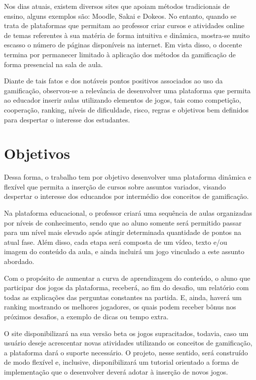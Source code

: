 Nos dias atuais, existem diversos sites que apoiam métodos tradicionais de ensino, alguns exemplos são: Moodle, Sakai e Dokeos. No entanto, quando se trata de plataformas que permitam ao professor criar cursos e atividades online de temas referentes à sua matéria de forma intuitiva e dinâmica, mostra-se muito escasso o número de páginas disponíveis na internet. Em vista disso, o docente termina por permanecer limitado à aplicação dos métodos da gamificação de forma presencial na sala de aula. 

Diante de tais fatos e dos notáveis pontos positivos associados ao uso da gamificação, observou-se a relevância de desenvolver uma plataforma que permita ao educador inserir aulas utilizando elementos de jogos, tais como competição, cooperação, ranking, níveis de dificuldade, risco, regras e objetivos bem definidos para despertar o interesse dos estudantes.

\section{Objetivos}
\label{sc:objetivo}

Dessa forma, o trabalho tem por objetivo desenvolver uma plataforma dinâmica e flexível que permita a inserção de cursos sobre assuntos variados, visando despertar o interesse dos educandos por intermédio dos conceitos de gamificação.

Na plataforma educacional, o professor criará uma sequência de aulas organizadas por níveis de conhecimento, sendo que ao aluno somente será permitido passar para um nível mais elevado após atingir determinada quantidade de pontos na atual fase. Além disso, cada etapa será composta de um vídeo, texto e/ou imagem do conteúdo da aula, e ainda incluirá um jogo vinculado a este assunto abordado.

Com o propósito de aumentar a curva de aprendizagem do conteúdo, o aluno que participar dos jogos da plataforma, receberá, ao fim do desafio, um relatório com todas as explicações das perguntas constantes na partida. E, ainda, haverá um ranking mostrando os melhores jogadores, os quais podem receber bônus nos próximos desafios, a exemplo de dicas ou tempo extra.

O site disponibilizará na sua versão beta os jogos supracitados, todavia, caso um usuário deseje acrescentar novas atividades utilizando os conceitos de gamificação, a plataforma dará o suporte necessário. O projeto, nesse sentido, será construído de modo flexível e, inclusive, disponibilizará um tutorial orientado a forma de implementação que o desenvolver deverá adotar à inserção de novos jogos.

